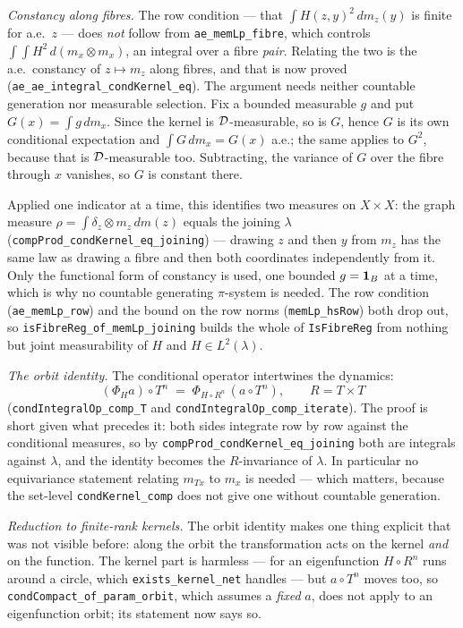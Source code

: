 \begin{remark}
  \smallskip
  \emph{Constancy along fibres.}  The row condition --- that $\int H(z,y)^2\,dm_z(y)$ is
  finite for a.e.\ $z$ --- does \emph{not} follow from \texttt{ae\_memLp\_fibre}, which
  controls $\int\!\!\int H^2\,d(m_x \otimes m_x)$, an integral over a fibre \emph{pair}.
  Relating the two is the a.e.\ constancy of $z \mapsto m_z$ along fibres, and that is now
  proved (\texttt{ae\_ae\_integral\_condKernel\_eq}).  The argument needs neither countable
  generation nor measurable selection.  Fix a bounded measurable $g$ and put
  $G(x) = \int g\,dm_x$.  Since the kernel is $\mathcal{D}$-measurable, so is $G$, hence $G$ is its
  own conditional expectation and $\int G\,dm_x = G(x)$ a.e.; the same applies to $G^2$,
  because that is $\mathcal{D}$-measurable too.  Subtracting, the variance of $G$ over the fibre
  through $x$ vanishes, so $G$ is constant there.

  Applied one indicator at a time, this identifies two measures on $X \times X$: the graph
  measure $\rho = \int \delta_z \otimes m_z \,dm(z)$ equals the joining $\lambda$
  (\texttt{compProd\_condKernel\_eq\_joining}) --- drawing $z$ and then $y$ from $m_z$ has
  the same law as drawing a fibre and then both coordinates independently from it.  Only the
  functional form of constancy is used, one bounded $g = \mathbf{1}_B$ at a time, which is why no
  countable generating $\pi$-system is needed.  The row condition
  (\texttt{ae\_memLp\_row}) and the bound on the row norms (\texttt{memLp\_hsRow}) both drop
  out, so \texttt{isFibreReg\_of\_memLp\_joining} builds the whole of \texttt{IsFibreReg}
  from nothing but joint measurability of $H$ and $H \in L^2(\lambda)$.

  \smallskip
  \emph{The orbit identity.}  The conditional operator intertwines the dynamics:
  \[
    (\Phi_H a) \circ T^n \;=\; \Phi_{H \circ R^n}\,(a \circ T^n), \qquad R = T \times T
  \]
  (\texttt{condIntegralOp\_comp\_T} and \texttt{condIntegralOp\_comp\_iterate}).  The proof is
  short given what precedes it: both sides integrate row by row against the conditional
  measures, so by \texttt{compProd\_condKernel\_eq\_joining} both are integrals against
  $\lambda$, and the identity becomes the $R$-invariance of $\lambda$.  In particular no
  equivariance statement relating $m_{Tx}$ to $m_x$ is needed --- which matters, because the
  set-level \texttt{condKernel\_comp} does not give one without countable generation.

  \smallskip
  \emph{Reduction to finite-rank kernels.}  The orbit identity makes one thing explicit that
  was not visible before: along the orbit the transformation acts on the kernel \emph{and} on
  the function.  The kernel part is harmless --- for an eigenfunction $H \circ R^n$ runs
  around a circle, which \texttt{exists\_kernel\_net} handles --- but $a \circ T^n$ moves too,
  so \texttt{condCompact\_of\_param\_orbit}, which assumes a \emph{fixed} $a$, does not apply
  to an eigenfunction orbit; its statement now says so.


\end{remark}
